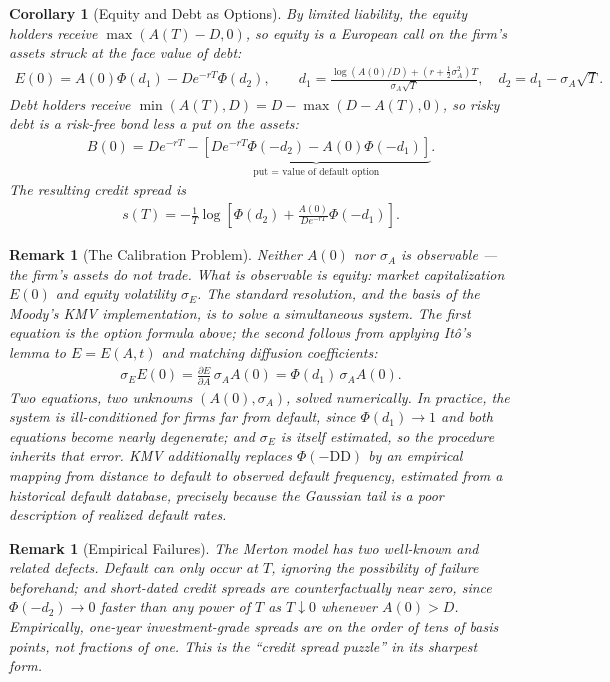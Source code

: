 \documentclass{report}
\theoremstyle{spacedplain}
\newtheorem{corollary}[theorem]{Corollary}
\theoremstyle{spaceddefinition}
\theoremstyle{spacedremark}
\newtheorem{remark}[theorem]{Remark}
\begin{document}
\begin{corollary}[Equity and Debt as Options]
    By limited liability, the equity holders receive $\max(A(T)-D,0)$, so equity is a European call on the firm's assets struck at the face value of debt:
    \begin{align}
        E(0) = A(0)\Phi(d_1) - De^{-rT}\Phi(d_2), \qquad d_1 = \frac{\log(A(0)/D)+(r+\tfrac12\sigma_A^2)T}{\sigma_A\sqrt{T}}, \quad d_2 = d_1 - \sigma_A\sqrt{T}.
    \end{align}
    Debt holders receive $\min(A(T),D) = D - \max(D-A(T),0)$, so risky debt is a risk-free bond less a put on the assets:
    \begin{align}
        B(0) = De^{-rT} - \underbrace{\left[De^{-rT}\Phi(-d_2) - A(0)\Phi(-d_1)\right]}_{\text{put = value of default option}}.
    \end{align}
    The resulting credit spread is
    \begin{align}
        s(T) = -\frac{1}{T}\log\!\left[\Phi(d_2) + \frac{A(0)}{De^{-rT}}\Phi(-d_1)\right].
    \end{align}
\end{corollary}

\begin{remark}[The Calibration Problem]
    Neither $A(0)$ nor $\sigma_A$ is observable --- the firm's assets do not trade. What \emph{is} observable is equity: market capitalization $E(0)$ and equity volatility $\sigma_E$. The standard resolution, and the basis of the Moody's KMV implementation, is to solve a simultaneous system. The first equation is the option formula above; the second follows from applying It\^o's lemma to $E = E(A,t)$ and matching diffusion coefficients:
    \begin{align}
        \sigma_E E(0) = \frac{\partial E}{\partial A}\,\sigma_A A(0) = \Phi(d_1)\,\sigma_A A(0).
    \end{align}
    Two equations, two unknowns $(A(0),\sigma_A)$, solved numerically. In practice, the system is ill-conditioned for firms far from default, since $\Phi(d_1)\to 1$ and both equations become nearly degenerate; and $\sigma_E$ is itself estimated, so the procedure inherits that error. KMV additionally replaces $\Phi(-\mathrm{DD})$ by an \emph{empirical} mapping from distance to default to observed default frequency, estimated from a historical default database, precisely because the Gaussian tail is a poor description of realized default rates.
\end{remark}

\begin{remark}[Empirical Failures]
    The Merton model has two well-known and related defects. Default can only occur \emph{at} $T$, ignoring the possibility of failure beforehand; and short-dated credit spreads are counterfactually near zero, since $\Phi(-d_2) \to 0$ faster than any power of $T$ as $T \downarrow 0$ whenever $A(0) > D$. Empirically, one-year investment-grade spreads are on the order of tens of basis points, not fractions of one. This is the ``credit spread puzzle'' in its sharpest form.
\end{remark}
\end{document}
